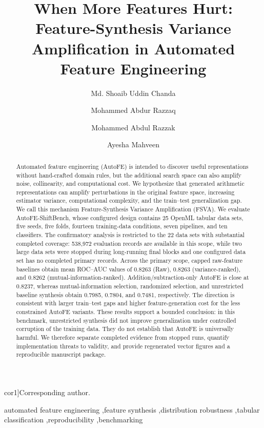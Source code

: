 \documentclass[preprint,12pt]{elsarticle}
\def\corref#1{}%
\def\cortext#1{}%
\def\ead#1{}%
\begin{document}
\begin{frontmatter}

\title{When More Features Hurt: Feature-Synthesis Variance Amplification in Automated Feature Engineering}

\author[inst1]{Md. Shoaib Uddin Chanda\corref{cor1}}
\ead{mdshoaibuddinchanda@gmail.com}
\cortext[cor1]{Corresponding author.}
\author[inst1]{Mohammed Abdur Razzaq}
\ead{160925748170@lords.ac.in}
\author[inst1]{Mohammed Abdul Razzak}
\ead{abdulrazzak.m2008@gmail.com}
\author[inst2]{Ayesha Mahveen}
\ead{24321abb0b@brecw.ac.in}
\address[inst1]{Lords Institute of Engineering \& Technology}
\address[inst2]{Bhoj Reddy Engineering College for Women}

\begin{abstract}
Automated feature engineering (AutoFE) is intended to discover useful representations without hand-crafted domain rules, but the additional search space can also amplify noise, collinearity, and computational cost.  We hypothesize that generated arithmetic representations can amplify perturbations in the original feature space, increasing estimator variance, computational complexity, and the train--test generalization gap.  We call this mechanism Feature-Synthesis Variance Amplification (FSVA).  We evaluate AutoFE-ShiftBench, whose configured design contains 25 OpenML tabular data sets, five seeds, five folds, fourteen training-data conditions, seven pipelines, and ten classifiers.  The confirmatory analysis is restricted to the 22 data sets with substantial completed coverage: 538,972 evaluation records are available in this scope, while two large data sets were stopped during long-running final blocks and one configured data set has no completed primary records.  Across the primary scope, capped raw-feature baselines obtain mean ROC--AUC values of 0.8263 (Raw), 0.8263 (variance-ranked), and 0.8262 (mutual-information-ranked).  Addition/subtraction-only AutoFE is close at 0.8237, whereas mutual-information selection, randomized selection, and unrestricted baseline synthesis obtain 0.7985, 0.7804, and 0.7481, respectively.  The direction is consistent with larger train--test gaps and higher feature-generation cost for the less constrained AutoFE variants.  These results support a bounded conclusion: in this benchmark, unrestricted synthesis did not improve generalization under controlled corruption of the training data.  They do not establish that AutoFE is universally harmful.  We therefore separate completed evidence from stopped runs, quantify implementation threats to validity, and provide regenerated vector figures and a reproducible manuscript package.
\end{abstract}

\begin{keyword}
automated feature engineering \sep feature synthesis \sep distribution robustness \sep tabular classification \sep reproducibility \sep benchmarking
\end{keyword}

\end{frontmatter}
\end{document}
